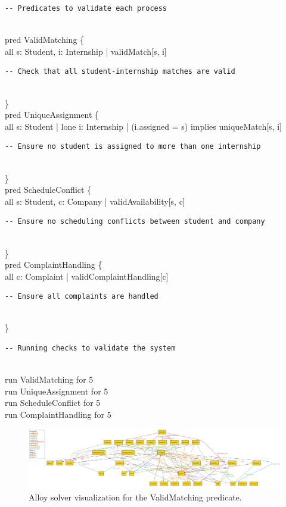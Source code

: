 \begin{verbatim}
-- Predicates to validate each process
\end{verbatim}\\
pred ValidMatching \{ \\
  all s: Student, i: Internship | validMatch[s, i] \begin{verbatim}
-- Check that all student-internship matches are valid
\end{verbatim}\\
\} \\

pred UniqueAssignment \{ \\
  all s: Student | lone i: Internship | (i.assigned = s) implies uniqueMatch[s, i] \begin{verbatim}
-- Ensure no student is assigned to more than one internship
\end{verbatim}\\
\} \\

pred ScheduleConflict \{ \\
  all s: Student, c: Company | validAvailability[s, c] \begin{verbatim}
-- Ensure no scheduling conflicts between student and company
\end{verbatim}\\
\} \\

pred ComplaintHandling \{ \\
  all c: Complaint | validComplaintHandling[c] \begin{verbatim}
-- Ensure all complaints are handled
\end{verbatim}\\
\} \\

\begin{verbatim}
-- Running checks to validate the system
\end{verbatim}\\
run ValidMatching for 5 \\
run UniqueAssignment for 5 \\
run ScheduleConflict for 5 \\
run ComplaintHandling for 5


\begin{figure}
\centering
\includegraphics[width=\textwidth, angle=0]{Images/Alloy.jpg}
\caption{\label{fig:metamodel}Alloy solver visualization for the ValidMatching predicate.}
\end{figure}

